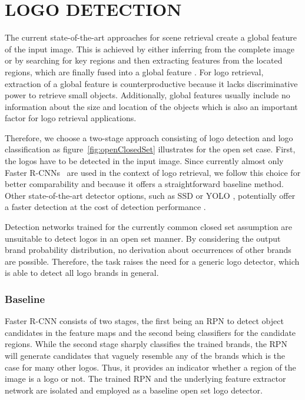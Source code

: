 \documentclass[a4paper,twoside]{article}
\begin{document}
\section{\uppercase{Logo Detection}}
\label{sec:detection}
\noindent The current state-of-the-art approaches for scene retrieval create a global feature of the input image. This is achieved by either inferring from the complete image or by searching for key regions and then extracting features from the located regions, which are finally fused into a global feature \cite{torii2015,arandjelovic2016,kalantidis2016}. For logo retrieval, extraction of a global feature is counterproductive because it lacks discriminative power to retrieve small objects. Additionally, global features usually include no information about the size and location of the objects which is also an important factor for logo retrieval applications.

Therefore, we choose a two-stage approach consisting of logo detection and logo classification as figure~\ref{fig:openClosedSet} illustrates for the open set case. First, the logos have to be detected in the input image. 
Since currently almost only Faster R-CNNs~\cite{ren2015} are used in the context of logo retrieval, we follow this choice for better comparability and because it offers a straightforward baseline method.
Other state-of-the-art detector options, such as SSD \cite{liu2016b} or YOLO \cite{redmon2016}, potentially offer a faster detection at the cost of detection performance \cite{huang2016b}.

Detection networks trained for the currently common closed set assumption are unsuitable to detect logos in an open set manner. By considering the output brand probability distribution, no derivation about occurrences of other brands are possible. Therefore, the task raises the need for a generic logo detector, which is able to detect all logo brands in general.

\subsubsection*{Baseline}
\vspace*{-2.5mm}
Faster R-CNN consists of two stages, the first being an \ac{RPN} to detect object candidates in the feature maps and the second being classifiers for the candidate regions. While the second stage sharply classifies the trained brands, the \ac{RPN} will generate candidates that vaguely resemble any of the brands which is the case for many other logos. Thus, it provides an indicator whether a region of the image is a logo or not. The trained \ac{RPN} and the underlying feature extractor network are isolated and employed as a baseline open set logo detector. 
\end{document}
